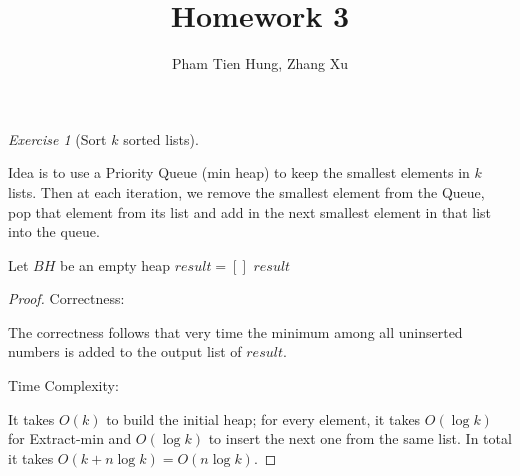 \documentclass[a4paper,10pt,twoside]{article}
\title{Homework 3}
\author{Pham Tien Hung, Zhang Xu}
\date{}
\theoremstyle{plain}
\theoremstyle{definition}
\theoremstyle{remark}
\newtheorem{exercise}{Exercise}
\begin{document}
\maketitle
\begin{exercise}[Sort $k$ sorted lists]\

Idea is to use a Priority Queue (min heap) to keep the smallest
elements in $k$ lists. Then at each iteration, we remove the smallest
element from the Queue, pop that element from its list and add in
the next smallest element in that list into the queue.

\begin{algorithm}[h]
	\caption{Merge $k$ sorted lists ($L[1][:], ..., L[k][:]$)}
	Let $BH$ be an empty heap\;
	$result = [  ]$
	\Return $result$\;
\end{algorithm}
\begin{proof}
Correctness: 

The correctness follows that very time the minimum among all uninserted numbers is added to the output list of $result$.

Time Complexity:

It takes $O(k)$ to build the initial heap; for every element, it takes $O(\log k)$ for Extract-min and $O(\log k)$ to insert the next one from the same list. In total it takes $O(k + n \log k) = O(n \log k)$.

\end{proof}
\end{exercise}
\end{document}
